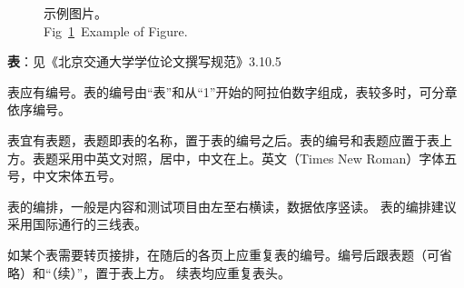 \begin{figure}[h]
	\addtocounter{subfigure}{-1}
	\caption{示例图片。\\Fig~\ref{fig:02:02}~Example of Figure.}
	\label{fig:02:02}
\end{figure} 

\textbf{表}：见《北京交通大学学位论文撰写规范》3.10.5

表应有编号。表的编号由“表”和从“1”开始的阿拉伯数字组成，表较多时，可分章依序编号。

表宜有表题，表题即表的名称，置于表的编号之后。表的编号和表题应置于表上方。表题采用中英文对照，居中，中文在上。英文（Times New Roman）字体五号，中文宋体五号。

表的编排，一般是内容和测试项目由左至右横读，数据依序竖读。
表的编排建议采用国际通行的三线表。

如某个表需要转页接排，在随后的各页上应重复表的编号。编号后跟表题（可省略）和“（续）”，置于表上方。
续表均应重复表头。

